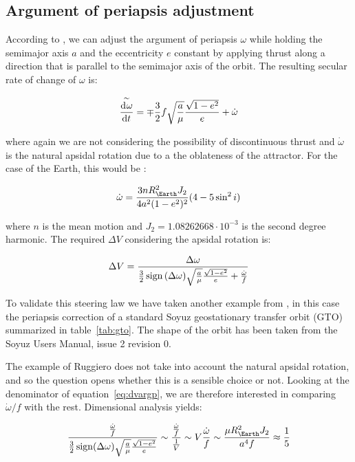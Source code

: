 \subsection{Argument of periapsis adjustment}

According to \cite{pollard1998evaluation}, we can adjust the argument of periapsis $\omega$ while holding the semimajor axis $a$ and the eccentricity $e$ constant by applying thrust along a direction that is parallel to the semimajor axis of the orbit. The resulting secular rate of change of $\omega$ is:

\[
\overset{\sim}{\frac{\operatorname{d}\!^{} \omega}{\operatorname{d}\! t^{}}} = \mp \frac{3}{2} f \sqrt{\frac{a}{\mu}} \frac{\sqrt{1 - e^2}}{e} + \dot{\omega}
\]

where again we are not considering the possibility of discontinuous thrust and $\dot{\omega}$ is the natural apsidal rotation due to a the oblateness of the attractor. For the case of the Earth, this would be \cite{vallado2001fundamentals}:

\[
\dot{\omega} = \frac{3 n R_{\Earth}^2 J_2}{4 a^2 (1 - e^2)^2} (4 - 5 \sin^2 i)
\]

where $n$ is the mean motion and $J_2 = 1.08262668 \cdot 10^{-3}$ is the second degree harmonic. The required $\Delta V$ considering the apsidal rotation is:

\begin{equation}
\Delta V = \frac{\Delta \omega}{\frac{3}{2} \operatorname{sign}{(\Delta \omega)} \sqrt{\frac{a}{\mu}} \frac{\sqrt{1 - e^2}}{e} + \frac{\dot{\omega}}{f}}
\label{eq:dvargp}
\end{equation}

To validate this steering law we have taken another example from \cite{ruggiero2011low}, in this case the periapsis correction of a standard Soyuz geostationary transfer orbit (GTO) summarized in table~\ref{tab:gto}. The shape of the orbit has been taken from the Soyuz Users Manual, issue 2 revision 0.

The example of Ruggiero does not take into account the natural apsidal rotation, and so the question opens whether this is a sensible choice or not. Looking at the denominator of equation~\ref{eq:dvargp}, we are therefore interested in comparing $\dot{\omega} / f$ with the rest. Dimensional analysis yields:

\[
\frac{\frac{\dot{\omega}}{f}}{\frac{3}{2} \sign (\Delta \omega) \sqrt{\frac{a}{\mu}} \frac{\sqrt{1 - e^2}}{e}} \sim %
\frac{\frac{\dot{\omega}}{f}}{\frac{1}{V}} \sim %
V \frac{\dot{\omega}}{f} \sim %
\frac{\mu R_{\Earth}^2 J_2}{a^4 f} \approx \frac{1}{5}
\]

